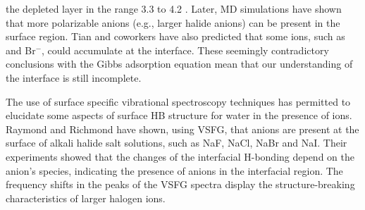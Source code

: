the depleted layer in the range 3.3 to 4.2 \A.
Later, MD simulations have shown that more polarizable anions (e.g., larger halide anions) 
can be present in the surface region\cite{Jungwirth2001,Jungwirth2002}. 
Tian and coworkers\cite{TianCS2011} have also predicted that some ions, such as \I and Br$^{-}$, could accumulate at the interface.
These seemingly contradictory conclusions with the Gibbs adsorption equation mean that our understanding of the interface is still incomplete. 

%

The use of surface specific vibrational spectroscopy techniques has 
permitted to elucidate some aspects of surface HB structure for water in 
the presence of ions\cite{Jubb2012,AGL05}. 
Raymond and Richmond\cite{Raymond2004} have shown, using VSFG, that anions are present at the surface of alkali halide salt solutions, 
such as NaF, NaCl, NaBr and NaI. Their experiments showed that the changes of the interfacial H-bonding depend on the anion's species, 
indicating the presence of anions in the interfacial region. The frequency shifts in the peaks of the VSFG spectra display 
the structure-breaking characteristics of larger halogen ions.


